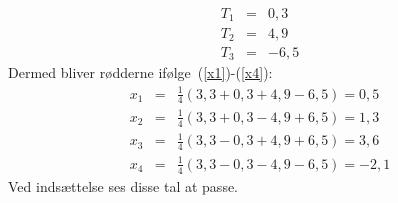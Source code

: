 \documentclass[12pt,oneside,a4paper]{article}
\newcommand{\bea}{\begin{eqnarray}}
\newcommand{\eea}{\end{eqnarray}}
\begin{document}
\bea
T_1 &=& 0,3 \\
T_2 &=& 4,9 \\
T_3 &=& -6,5
\eea
Dermed bliver rødderne ifølge~(\ref{x1})-(\ref{x4}):
\bea
x_1 &=& \frac14(3,3+0,3+4,9-6,5) = 0,5 \\
x_2 &=& \frac14(3,3+0,3-4,9+6,5) = 1,3 \\
x_3 &=& \frac14(3,3-0,3+4,9+6,5) = 3,6 \\
x_4 &=& \frac14(3,3-0,3-4,9-6,5) = -2,1
\eea
Ved indsættelse ses disse tal at passe.
\end{document}
